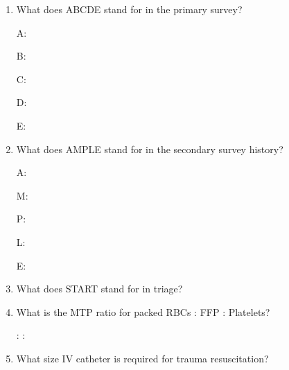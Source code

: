 \documentclass[11pt]{article}
\begin{document}
\begin{enumerate}
    \item What does ABCDE stand for in the primary survey?
    
    A: \underline{\hspace{8cm}}
    
    B: \underline{\hspace{8cm}}
    
    C: \underline{\hspace{8cm}}
    
    D: \underline{\hspace{8cm}}
    
    E: \underline{\hspace{8cm}}
    
    \vspace{0.3cm}
    
    \item What does AMPLE stand for in the secondary survey history?
    
    A: \underline{\hspace{8cm}}
    
    M: \underline{\hspace{8cm}}
    
    P: \underline{\hspace{8cm}}
    
    L: \underline{\hspace{8cm}}
    
    E: \underline{\hspace{8cm}}
    
    \vspace{0.3cm}
    
    \item What does START stand for in triage?
    
    \underline{\hspace{10cm}}
    
    \vspace{0.3cm}
    
    \item What is the MTP ratio for packed RBCs : FFP : Platelets?
    
    \underline{\hspace{3cm}} : \underline{\hspace{3cm}} : \underline{\hspace{3cm}}
    
    \vspace{0.3cm}
    
    \item What size IV catheter is required for trauma resuscitation?
    

\end{enumerate}
\end{document}

